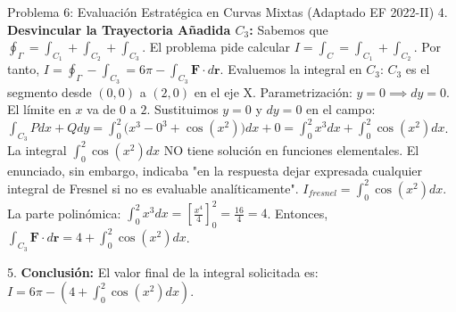 \documentclass[11pt,a4paper]{article}
\begin{document}
\begin{ejerciciobox}{Problema 6: Evaluación Estratégica en Curvas Mixtas (Adaptado EF 2022-II)}
4. \textbf{Desvincular la Trayectoria Añadida $C_3$:}
Sabemos que $\oint_\Gamma = \int_{C_1} + \int_{C_2} + \int_{C_3}$.
El problema pide calcular $I = \int_C = \int_{C_1} + \int_{C_2}$.
Por tanto, $I = \oint_\Gamma - \int_{C_3} = 6\pi - \int_{C_3} \mathbf{F} \cdot d\mathbf{r}$.
Evaluemos la integral en $C_3$:
$C_3$ es el segmento desde $(0,0)$ a $(2,0)$ en el eje X.
Parametrización: $y = 0 \implies dy = 0$. El límite en $x$ va de $0$ a $2$.
Sustituimos $y=0$ y $dy=0$ en el campo:
$\int_{C_3} P dx + Q dy = \int_0^2 \big( x^3 - 0^3 + \cos(x^2) \big) dx + 0 = \int_0^2 x^3 dx + \int_0^2 \cos(x^2) dx$.
La integral $\int_0^2 \cos(x^2) dx$ NO tiene solución en funciones elementales. El enunciado, sin embargo, indicaba "en la respuesta dejar expresada cualquier integral de Fresnel si no es evaluable analíticamente".
$I_{fresnel} = \int_0^2 \cos(x^2) dx$.
La parte polinómica: $\int_0^2 x^3 dx = \left[ \frac{x^4}{4} \right]_0^2 = \frac{16}{4} = 4$.
Entonces, $\int_{C_3} \mathbf{F} \cdot d\mathbf{r} = 4 + \int_0^2 \cos(x^2) dx$.

5. \textbf{Conclusión:}
El valor final de la integral solicitada es:
$I = 6\pi - \left( 4 + \int_0^2 \cos(x^2) dx \right)$.

\end{ejerciciobox}
\end{document}
